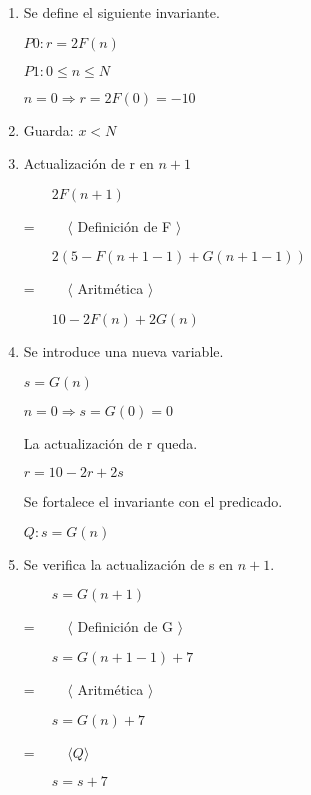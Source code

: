 \documentclass[hidelinks]{article}
\begin{document}
\begin{enumerate}
	\item Se define el siguiente invariante. \par
	      \begin{center}
		      $P0: r = 2 F(n)$ \par
		      $P1: 0\leq n \leq N$ \par
		      $n = 0 \Rightarrow r = 2F(0)=-10$ \par
	      \end{center}
	\item Guarda: $x<N$ \par
	\item Actualización de r en $n+1$ \par
	      $\qquad 2 F(n+1)$ \par
	      = $\qquad \langle$ Definición de F $\rangle$\par
	      $\qquad 2(5-F(n+1-1)+G(n+1-1))$ \par
	      = $\qquad \langle$ Aritmética $\rangle$\par
	      $\qquad 10-2F(n)+2G(n)$ \par

	\item Se introduce una nueva variable. \par
	      $s = G(n)$ \par
	      $n=0 \Rightarrow s = G(0)=0$ \par
	      La actualización de r queda. \par

	      \begin{center}
		      $r = 10 - 2r + 2s$ \par
	      \end{center}

	      Se fortalece el invariante con el predicado.
	      \begin{center}
		      $Q: s = G(n)$ \par
	      \end{center}

	\item Se verifica la actualización de s en $n+1$. \par
	      $\qquad s = G(n+1)$ \par
	      = $\qquad \langle$ Definición de G $\rangle$\par
	      $\qquad s = G(n+1-1)+7$ \par
	      = $\qquad \langle$ Aritmética $\rangle$\par
	      $\qquad s = G(n)+7$ \par
	      = $\qquad \langle Q \rangle$\par
	      $\qquad s = s+7$ \par


\end{enumerate}
\end{document}
